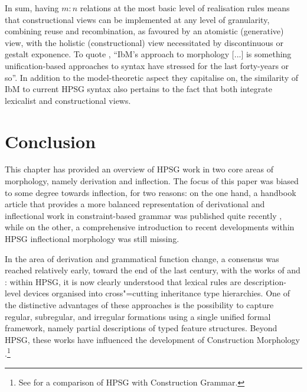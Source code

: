 \documentclass[output=paper
	        ,collection
	        ,collectionchapter
 	        ,biblatex
                ,babelshorthands
                ,newtxmath
                ,draftmode
                ,colorlinks, citecolor=brown
]{langscibook}
\begin{document}
\begin{exe}
\begin{xlist}
\begin{exe}
\begin{xlist}
\bigskip\noindent In sum, having $m:n$ relations at the most basic
level of realisation rules means that constructional views can be
implemented at any level of granularity, combining reuse and
recombination, as favoured by an atomistic (generative) view, with the
holistic (constructional) view necessitated by discontinuous or
gestalt exponence.  To quote \citet{diaz:koenig:michelson:19}, ``IbM’s
approach to morphology [...] is something unification-based approaches
to syntax have stressed for the last forty-years or so''. In addition
to the model-theoretic aspect they capitalise on, the similarity of
IbM to current HPSG syntax also pertains to the fact that both integrate
lexicalist and constructional views.

\section{Conclusion}

This chapter has provided an overview of HPSG work in two core areas
of morphology, namely derivation and inflection. The focus of this
paper was biased to some degree towards inflection, for two reasons:
on the one hand, a handbook article that provides a more balanced
representation of derivational and inflectional work in
constraint-based grammar was published quite recently
\citep{Bonami15b}, while on the other, a comprehensive introduction
to recent developments within HPSG inflectional morphology was still
missing.

In the area of derivation and grammatical function change, a consensus
was reached relatively early, toward the end of the last century, with
the works of \citet{Riehemann98} and \cite{Koenig99}: within HPSG, it
is now clearly understood that lexical rules are description-level
devices organised into cross"=cutting inheritance type
hierarchies. One of the distinctive advantages of these approaches is
the possibility to capture regular, subregular, and irregular
formations using a single unified formal framework, namely partial
descriptions of typed feature structures. Beyond HPSG, these works have
influenced the development of Construction Morphology \citep{Booij10}.\footnote{See  for a comparison of HPSG with Construction Grammar.}


\end{xlist}
\end{exe}
\end{xlist}
\end{exe}
\end{document}
